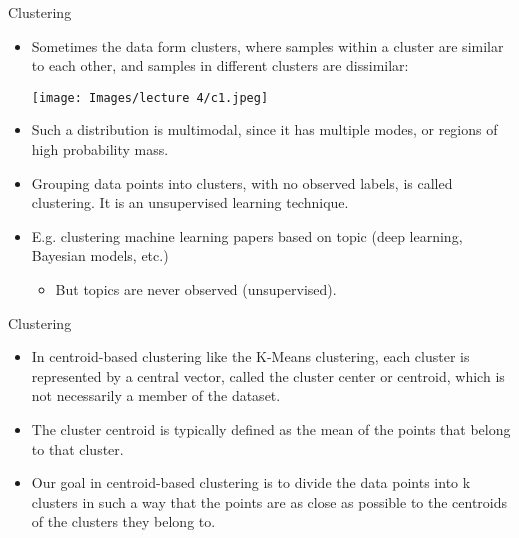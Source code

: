 \documentclass[xcolor=dvipsnames, 9pt]{beamer} %
\begin{document}
\begin{frame}{Clustering}
\begin{itemize}
    \item Sometimes the data form clusters, where samples within a cluster are similar to each other, and samples in different clusters are dissimilar:
\begin{center}
\texttt{[image: Images/lecture 4/c1.jpeg]}
\end{center}
    \item Such a distribution is multimodal, since it has multiple modes, or regions of high probability mass.
    \item Grouping data points into clusters, with no observed labels, is called clustering. It is an unsupervised learning technique.
    \item E.g. clustering machine learning papers based on topic (deep learning, Bayesian models, etc.)
    \begin{itemize}
        \item But topics are never observed (unsupervised).
    \end{itemize}

\end{itemize}
\end{frame}

\begin{frame}{Clustering}
\begin{itemize}
    \item In centroid-based clustering like the K-Means clustering, each cluster is represented by a central vector, called the cluster center or centroid, which is not necessarily a member of the dataset. 
    \item The cluster centroid is typically defined as the mean of the points that belong to that cluster.
    \item Our goal in centroid-based clustering is to divide the data points into k clusters in such a way that the points are as close as possible to the centroids of the clusters they belong to.
\end{itemize}
\end{frame}
\end{document}
